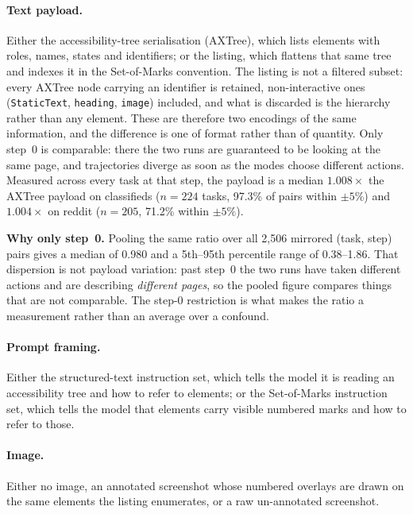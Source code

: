 \paragraph{Text payload.} Either the accessibility-tree serialisation (AXTree),
which lists elements with roles, names, states and identifiers; or the
\sommarks{} listing, which flattens that same tree and indexes it in the
Set-of-Marks convention. The listing is not a filtered subset: every AXTree node
carrying an identifier is retained, non-interactive ones (\texttt{StaticText},
\texttt{heading}, \texttt{image}) included, and what is discarded is the
hierarchy rather than any element. These are therefore two encodings of the same
information, and the difference is one of format rather than of quantity. Only step~0 is comparable: there the two runs are guaranteed to be looking at the same page, and trajectories diverge as soon as the modes choose different actions. Measured across every task at that step, the \sommarks{} payload is a median $1.008\times$ the
AXTree payload on classifieds ($n=224$ tasks, 97.3\% of pairs within $\pm5$\%)
and $1.004\times$ on reddit ($n=205$, 71.2\% within $\pm5$\%).

\begin{scopebox}
\textbf{Why only step~0.} Pooling the same ratio over all 2{,}506 mirrored
(task, step) pairs gives a median of 0.980 and a 5th--95th percentile range of
0.38--1.86. That dispersion is not payload variation: past step~0 the two runs
have taken different actions and are describing \emph{different pages}, so the
pooled figure compares things that are not comparable. The step-0 restriction is
what makes the ratio a measurement rather than an average over a confound.
\end{scopebox}

\paragraph{Prompt framing.} Either the structured-text instruction set, which
tells the model it is reading an accessibility tree and how to refer to elements;
or the Set-of-Marks instruction set, which tells the model that elements carry
visible numbered marks and how to refer to those.

\paragraph{Image.} Either no image, an annotated screenshot whose numbered
overlays are drawn on the same elements the \sommarks{} listing enumerates, or a
raw un-annotated screenshot.

